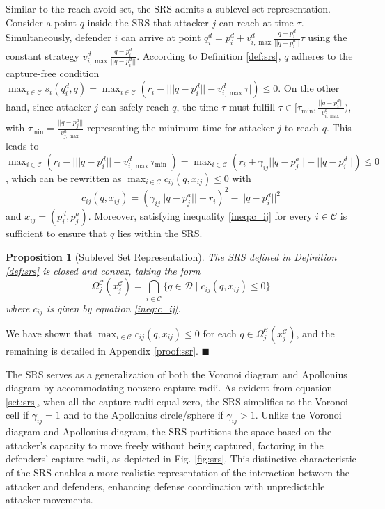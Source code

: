 \documentclass[journal]{IEEEtran}
\newenvironment{Proof}{\noindent{\em Proof:\/}}{\hfill $\blacksquare$\par}
\newtheorem{Proposition}{\bf Proposition}
\newcommand{\D}{\mathcal{D}}
\newcommand{\C}{\mathcal{C}}
\newcommand{\1}{\mathbf{1}}
\begin{document}
Similar to the reach-avoid set, the SRS admits a sublevel set representation. Consider a point $q$ inside the SRS that attacker $j$ can reach at time $\tau$. Simultaneously, defender $i$ can arrive at point $q^d_i=p^d_i+v^d_{i,\max}\frac{q-p^d_i}{||q-p^d_i||}\tau$ using the constant strategy $v^d_{i,\max}\frac{q-p^d_i}{||q-p^d_i||}$. According to Definition \ref{def:srs}, $q$ adheres to the capture-free condition $\max_{i\in \C}s_i(q^d_i,q)=\max_{i\in \C}(r_i-\bigl\lvert ||q-p^d_i||-v^d_{i,\max}\tau \bigr\rvert)\leq 0$. On the other hand, since attacker $j$ can safely reach $q$, the time $\tau$ must fulfill $\tau\in [\tau_{\min},\frac{||q-p^d_i||}{v^{d}_{i,\max}})$, with $\tau_{\min}=\frac{||q-p^a_j||}{v^{a}_{j,\max}}$ representing the minimum time for attacker $j$ to reach $q$. This leads to $\max_{i\in \C}(r_i-\bigl\lvert ||q-p^d_i||-v^d_{i,\max}\tau_{\min} \bigr\rvert)=\max_{i\in \C}(r_i+\gamma_{ij}||q-p^a_j||-||q-p^d_i||)\leq 0$, which can be rewritten as $\max_{i\in \C}c_{ij}(q,x_{ij})\leq 0$ with
\begin{equation}\label{ineq:c_ij}
	c_{ij}(q,x_{ij})=(\gamma_{ij}||q-p^a_j||+r_i)^2-||q-p^d_i||^2
\end{equation}
and $x_{ij}=(p^d_i,p^a_j)$. Moreover, satisfying inequality \eqref{ineq:c_ij} for every $i\in \C$ is sufficient to ensure that $q$ lies within the SRS. 

\begin{Proposition}[Sublevel Set Representation]\label{prop:ssr}
The SRS defined in Definition \ref{def:srs} is closed and convex, taking the form 
\begin{equation}\label{set:srs}
	\Omega^\C_j(x^\C_j)=\bigcap_{i\in \C}\Big\lbrace q\in \D\mid c_{ij}(q,x_{ij})\leq 0 \Big\rbrace
\end{equation}
where $c_{ij}$ is given by equation \eqref{ineq:c_ij}.
\end{Proposition}

\begin{Proof}
We have shown that $\max_{i\in \C}c_{ij}(q,x_{ij})\leq 0$ for each $q\in\Omega^\C_j(x^\C_j)$, and the remaining is detailed in Appendix \ref{proof:ssr}.
\end{Proof}

The SRS serves as a generalization of both the Voronoi diagram and Apollonius diagram by accommodating nonzero capture radii. As evident from equation \eqref{set:srs}, when all the capture radii equal zero, the SRS simplifies to the Voronoi cell if $\gamma_{ij}=1$ and to the Apollonius circle/sphere if $\gamma_{ij}>1$. Unlike the Voronoi diagram and Apollonius diagram, the SRS partitions the space based on the attacker's capacity to move freely without being captured, factoring in the defenders' capture radii, as depicted in Fig. \ref{fig:srs}. This distinctive characteristic of the SRS enables a more realistic representation of the interaction between the attacker and defenders, enhancing defense coordination with unpredictable attacker movements.
\end{document}
